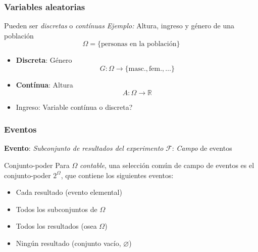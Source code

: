 \documentclass[xcolor=dvipsnames,10pt]{beamer}
\begin{document}
%
\begin{frame}
  \frametitle{Variables aleatorias}
  Pueden ser \emph{discretas} o \emph{contínuas}
  \emph{Ejemplo:} Altura, ingreso y género de una población
  \begin{equation*}
    \Omega = \{ \text{personas en la población} \}
  \end{equation*}
  \begin{itemize}
  \item \textbf{Discreta}: Género
    \begin{equation*}
      G \colon \Omega \to \{ \text{masc.}, \text{fem.}, \dots \}
    \end{equation*}
  \item \textbf{Contínua}: Altura
    \begin{equation*}
      A \colon \Omega \to \mathbb{R}
    \end{equation*}
  \item Ingreso: Variable contínua o discreta?
  \end{itemize}
\end{frame}
%
\begin{frame}
  \frametitle{Eventos}
  \begin{tcolorbox}
    \textbf{Evento}: \emph{Subconjunto de resultados del experimento}
    \tcblower
    $\mathcal{F}$: \emph{Campo} de eventos
  \end{tcolorbox}
  \begin{definicion*}{Conjunto-poder}{}
    Para $\Omega$ \emph{contable}, una selección común de campo de eventos es el conjunto-poder $2^{\Omega}$, que contiene los siguientes eventos:
    \begin{itemize}
    \item Cada resultado (evento elemental)
    \item Todos los subconjuntos de $\Omega$
    \item Todos los resultados (osea $\Omega$)
    \item Ningún resultado (conjunto vacío, $\varnothing$)
    \end{itemize}
  \end{definicion*}
\end{frame}
%
\end{document}
